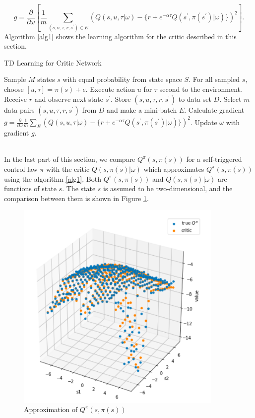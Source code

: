 \documentclass[english, dvipdfmx]{ampmt}             %
\newcommand{\pdif}[2]{\frac{\partial#1}{\partial#2}}
\begin{document}
\begin{equation}
	g = \pdif{}{\omega}\left[\frac{1}{m}\sum_{(s,u,\tau,r,s^{\prime})\in E}\left(Q(s,u,\tau|\omega) - \{r + e^{-\alpha\tau}Q(s^{\prime}, \pi(s^{\prime})|\omega)\}\right)^2\right].
\end{equation}
Algorithm \ref{alg1} shows the learning algorithm for the critic described in this section.
\begin{algorithm}                      
\caption{TD Learning for Critic Network}         
\label{alg1}                          
\begin{algorithmic}                  
    \STATE Sample $M$ states $s$ with equal probability from state space $S$.
    	\STATE For all sampled $s$, choose $[u, \tau]=\pi(s) + e$.
	\STATE Execute action $u$ for $\tau$ second to the environment.
	\STATE Receive $r$ and observe next state $s^{\prime}$.
	\STATE Store $(s, u, \tau, r, s^{\prime})$ to data set $D$.
    \ENDFOR
    	\STATE Select $m$ data pairs $(s, u, \tau, r, s^{\prime})$ from $D$ and make a mini-batch $E$.
	\STATE Calculate gradient $g = \pdif{}{\omega} \frac{1}{m}\sum_{E}\left(Q(s,u,\tau|\omega) - \{r + e^{-\alpha\tau}Q(s^{\prime}, \pi(s^{\prime})|\omega)\}\right)^2$.
	\STATE Update $\omega$ with gradient $g$.
    \ENDFOR
    \end{algorithmic}
\end{algorithm}\\
In the last part of this section, we compare $Q^{\pi}(s, \pi(s))$ for a self-triggered control law $\pi$ with the critic $Q(s,\pi(s)|\omega)$ which approximates $Q^{\pi}(s, \pi(s))$ using the algorithm \ref{alg1}. Both $Q^{\pi}(s, \pi(s))$ and $Q(s, \pi(s)|\omega)$ are functions of state $s$. The state $s$ is assumed to be two-dimensional, and the comparison between them is shown in Figure \ref{Q_approximation}. 
\begin{figure}[H]
	\centering
 	\includegraphics[width=10cm]{Q_approximation.png}
 	\caption{Approximation of $Q^{\pi}(s,\pi(s))$} \label{Q_approximation}
\end{figure}
\end{document}
